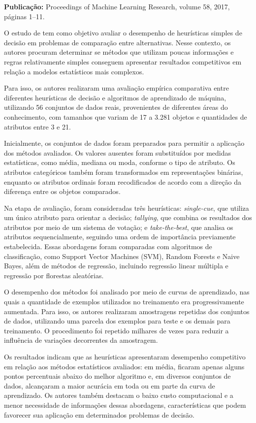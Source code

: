 \textbf{Publicação:} Proceedings of Machine Learning Research, volume 58, 2017, páginas 1–11.

O estudo de  tem como objetivo avaliar o desempenho de heurísticas simples de decisão em problemas de comparação entre alternativas. Nesse contexto, os autores procuram determinar se métodos que utilizam poucas informações e regras relativamente simples conseguem apresentar resultados competitivos em relação a modelos estatísticos mais complexos.

Para isso, os autores realizaram uma avaliação empírica comparativa entre diferentes heurísticas de decisão e algoritmos de aprendizado de máquina, utilizando 56 conjuntos de dados reais, provenientes de diferentes áreas do conhecimento, com tamanhos que variam de 17 a 3.281 objetos e quantidades de atributos entre 3 e 21.

Inicialmente, os conjuntos de dados foram preparados para permitir a aplicação dos métodos avaliados. Os valores ausentes foram substituídos por medidas estatísticas, como média, mediana ou moda, conforme o tipo de atributo. Os atributos categóricos também foram transformados em representações binárias, enquanto os atributos ordinais foram recodificados de acordo com a direção da diferença entre os objetos comparados.

Na etapa de avaliação, foram consideradas três heurísticas: \textit{single-cue}, que utiliza um único atributo para orientar a decisão; \textit{tallying}, que combina os resultados dos atributos por meio de um sistema de votação; e \textit{take-the-best}, que analisa os atributos sequencialmente, seguindo uma ordem de importância previamente estabelecida. Essas abordagens foram comparadas com algoritmos de classificação, como Support Vector Machines (SVM), Random Forests e Naive Bayes, além de métodos de regressão, incluindo regressão linear múltipla e regressão por florestas aleatórias.

O desempenho dos métodos foi analisado por meio de curvas de aprendizado, nas quais a quantidade de exemplos utilizados no treinamento era progressivamente aumentada. Para isso, os autores realizaram amostragens repetidas dos conjuntos de dados, utilizando uma parcela dos exemplos para teste e os demais para treinamento. O procedimento foi repetido milhares de vezes para reduzir a influência de variações decorrentes da amostragem.

Os resultados indicam que as heurísticas apresentaram desempenho competitivo em relação aos métodos estatísticos avaliados: em média, ficaram apenas alguns pontos percentuais abaixo do melhor algoritmo e, em diversos conjuntos de dados, alcançaram a maior acurácia em toda ou em parte da curva de aprendizado. Os autores também destacam o baixo custo computacional e a menor necessidade de informações dessas abordagens, características que podem favorecer sua aplicação em determinados problemas de decisão.

